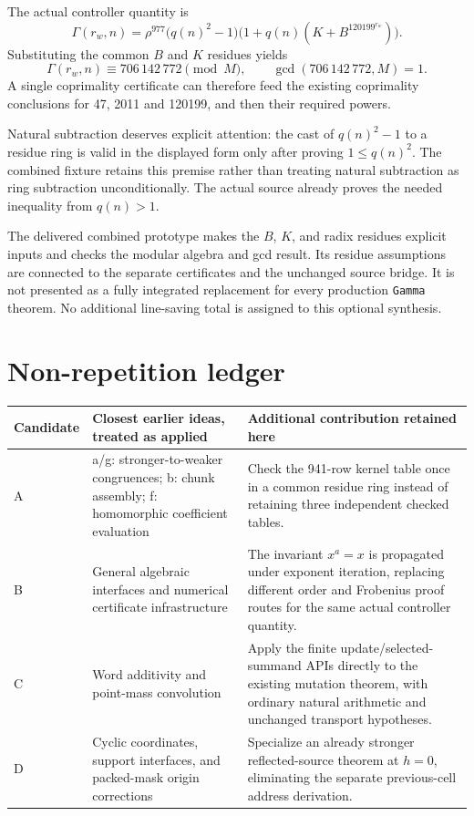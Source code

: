 \documentclass[11pt,letterpaper]{article}
\newcommand{\code}[1]{\nolinkurl{#1}}
\begin{document}
The actual controller quantity is
\[
 \Gamma(r_w,n)=\rho^{977}\bigl(q(n)^2-1\bigr)
             \bigl(1+q(n)(K+B^{120199^{r_w}})\bigr).
\]
Substituting the common \(B\) and \(K\) residues yields
\[
 \Gamma(r_w,n)\equiv706\,142\,772\pmod M,
 \qquad \gcd(706\,142\,772,M)=1.
\]
A single coprimality certificate can therefore feed the existing coprimality conclusions for 47, 2011 and 120199, and then their required powers.

Natural subtraction deserves explicit attention: the cast of \(q(n)^2-1\) to a residue ring is valid in the displayed form only after proving \(1\le q(n)^2\). The combined fixture retains this premise rather than treating natural subtraction as ring subtraction unconditionally. The actual source already proves the needed inequality from \(q(n)>1\).

The delivered combined prototype makes the \(B\), \(K\), and radix residues explicit inputs and checks the modular algebra and gcd result. Its residue assumptions are connected to the separate certificates and the unchanged source bridge. It is not presented as a fully integrated replacement for every production \code{Gamma} theorem. No additional line-saving total is assigned to this optional synthesis.

\section{Non-repetition ledger}

\begin{longtable}{@{}>{\raggedright\arraybackslash}p{}>{\raggedright\arraybackslash}p{}>{\raggedright\arraybackslash}p{}@{}}
\toprule
Candidate & Closest earlier ideas, treated as applied & Additional contribution retained here\\
\midrule
\endhead
A & a/g: stronger-to-weaker congruences; b: chunk assembly; f: homomorphic coefficient evaluation & Check the 941-row kernel table once in a common residue ring instead of retaining three independent checked tables.\\
\addlinespace
B & General algebraic interfaces and numerical certificate infrastructure & The invariant \(x^a=x\) is propagated under exponent iteration, replacing different order and Frobenius proof routes for the same actual controller quantity.\\
\addlinespace
C & Word additivity and point-mass convolution & Apply the finite update/selected-summand APIs directly to the existing mutation theorem, with ordinary natural arithmetic and unchanged transport hypotheses.\\
\addlinespace
D & Cyclic coordinates, support interfaces, and packed-mask origin corrections & Specialize an already stronger reflected-source theorem at \(h=0\), eliminating the separate previous-cell address derivation.\\
\bottomrule
\end{longtable}
\end{document}
